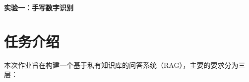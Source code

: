 \documentclass[11pt]{article}
\begin{document}
	\pagestyle{fancy}
	\chead{}
	
	\begin{center}
		{\LARGE \bf 实验一：手写数字识别} 
	\end{center}
	\begin{center}
		\large{}
	\end{center}

	\section{任务介绍}
	本次作业旨在构建一个基于私有知识库的问答系统（RAG），主要的要求分为三层：
\end{document}
